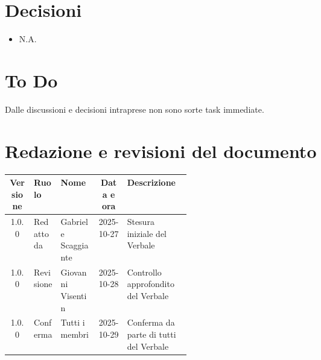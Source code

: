 \documentclass[a4paper,12pt]{article}
\begin{document}
\section{Decisioni}
\begin{itemize}
    \item N.A.
\end{itemize}

\section{To Do}
Dalle discussioni e decisioni intraprese non sono sorte task immediate.

\clearpage
\section{Redazione e revisioni del documento}

\begin{center}
\small
\renewcommand{\arraystretch}{1.2} 
\begin{tabular}{|c|l|l|c|>{\raggedright\arraybackslash}p{0.35\linewidth}|}
\hline
\rowcolor{gray!60} 
\textbf{Versione} & \textbf{Ruolo} & \textbf{Nome} & \textbf{Data e ora} & \textbf{Descrizione} \\
\hline
\rowcolor{white}
1.0.0 & Redatto da & Gabriele Scaggiante & 2025-10-27 & Stesura iniziale del Verbale \\
\hline
\rowcolor{gray!20}
1.0.0 & Revisione & Giovanni Visentin & 2025-10-28 & Controllo approfondito del Verbale \\
\hline
\rowcolor{white}
1.0.0 & Conferma & Tutti i membri & 2025-10-29 & Conferma da parte di tutti del Verbale \\
\hline

\end{tabular}
\end{center}


\end{document}
